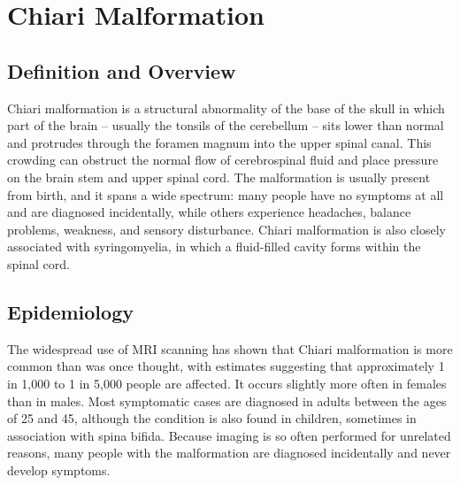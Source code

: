 \chapter{Chiari Malformation}

\section*{Definition and Overview}
Chiari malformation is a structural abnormality of the base of the skull in which part of the brain -- usually the tonsils of the cerebellum -- sits lower than normal and protrudes through the foramen magnum into the upper spinal canal. This crowding can obstruct the normal flow of cerebrospinal fluid and place pressure on the brain stem and upper spinal cord. The malformation is usually present from birth, and it spans a wide spectrum: many people have no symptoms at all and are diagnosed incidentally, while others experience headaches, balance problems, weakness, and sensory disturbance. Chiari malformation is also closely associated with syringomyelia, in which a fluid-filled cavity forms within the spinal cord.

\section*{Epidemiology}
The widespread use of MRI scanning has shown that Chiari malformation is more common than was once thought, with estimates suggesting that approximately 1 in 1,000 to 1 in 5,000 people are affected. It occurs slightly more often in females than in males. Most symptomatic cases are diagnosed in adults between the ages of 25 and 45, although the condition is also found in children, sometimes in association with spina bifida. Because imaging is so often performed for unrelated reasons, many people with the malformation are diagnosed incidentally and never develop symptoms.


